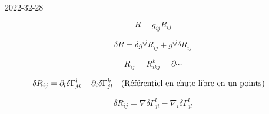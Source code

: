 


2022-32-28

$$R = g_{ij} R_{ij} $$ 

$$\delta R = \delta g^{ij} R_{ij} + g^{ij}\delta R_{ij} $$ 

$$R_{ij} = R_{ikj}^{k}= \partial\dotsb$$ 

$$\delta R_{ij} = \partial_l \delta \Gamma_{ji}^{l}- \partial_i \delta \Gamma_{jl}^{k} \qq{(Référentiel en chute libre en un points)}$$ 

$$\delta R_{ij} = \nabla \delta \Gamma_{ji}^{l}-\nabla_i \delta \Gamma_{jl}^{l}$$ 



